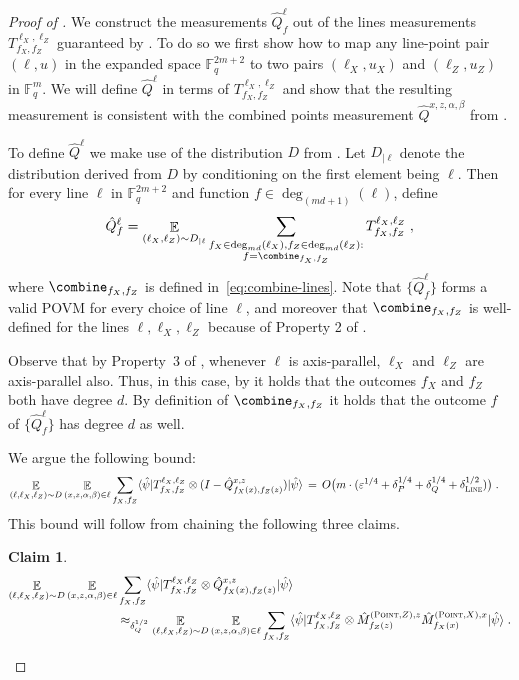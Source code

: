 \documentclass[11pt]{article}
\newtheorem{claim}[theorem]{Claim}
\theoremstyle{definition}
\newcommand{\ket}[1]{|#1\rangle}
\newcommand{\bra}[1]{\langle#1|}
\newcommand{\F}{\ensuremath{\mathbb{F}}}
\newcommand{\ot}{\otimes}
\newcommand{\eps}{\varepsilon}
\newcommand{\E}{\mathop{\mathbb{E}}\displaylimits}
\newcommand{\typestyle}[1]{\ensuremath{\textsc{#1}}\xspace}
\renewcommand{\line}{\mathbf{\ell}}
\newcommand{\Point}{\typestyle{Point}}
\newcommand{\Line}{\typestyle{Line}}
\begin{document}
\begin{proof}[Proof of ]
We construct the measurements $\hat{Q}^\line_f$
out of the lines measurements $T^{\line_X, \line_Z}_{f_X, f_Z}$
guaranteed by . To do so we first show how
to map any line-point pair $(\line, u)$ in the expanded space
$\F_q^{2m+2}$ to two pairs  $(\line_X, u_X)$ and  $(\line_Z, u_Z)$ in $\F_q^m$. We will 
define $\hat{Q}^\line$ in terms of $T^{\line_X, \line_Z}_{f_X, f_Z}$ and
show that the resulting measurement is consistent with the combined
points measurement $\hat{Q}^{x,z,\alpha, \beta}$ from .

To define $\hat{Q}^\line$ we make use of the distribution $D$ from . Let $D_{|\line}$ denote the distribution derived from $D$ by conditioning on the first element being $\line$. Then for every line $\line$ in $\F_q^{2m+2}$ and function $f \in \deg_{(md+1)}(\line)$, define
\[ \hat{Q}^\line_f = \E_{(\line_X, \line_Z) \sim D_{|\line}} \sum_{\substack{f_X \in \deg_{md}(\line_X), f_Z \in \deg_{md}(\line_Z):\\ f = \combine_{f_X, f_Z}}} T^{\line_X, \line_Z}_{f_X, f_Z}\;, \]
where $\combine_{f_X, f_Z}$ is defined in~\eqref{eq:combine-lines}. Note that $\{\hat{Q}^\line_f\}$ forms a valid POVM for every choice of line $\line$, and moreover that $\combine_{f_X, f_Z}$ is well-defined for the lines $\line, \line_X, \line_Z$ because of Property 2 of . 

Observe that by Property~3 of , whenever $\line$ is axis-parallel, $\line_X$ and $\line_Z$ are axis-parallel also. Thus, in this case, by  it holds that the outcomes $f_X$ and $f_Z$ both have degree $d$. By definition of $\combine_{f_X, f_Z}$ it holds that the outcome $f$ of $\{\hat{Q}^\line_f\}$ has degree $d$ as well.

We argue the following bound:
\begin{align}
  \E_{(\line, \line_X, \line_Z) \sim D} \E_{(x,z,\alpha, \beta) \in \line} &\sum_{f_X, f_Z} \bra{\hat{\psi}} T^{\line_X, \line_Z}_{f_X, f_Z} \ot (I - \hat{Q}^{x, z }_{f_X(x),f_Z(z)}) \ket{\hat{\psi}}  \,=\, O\big( m \cdot (\eps^{1/4} + \delta_P^{1/4} + \delta_Q^{1/4} + \delta_{\Line}^{1/2})\big)\;. \label{eq:qld-combined-lines-consistency}
\end{align}
This bound will follow from chaining the following three claims. 

\begin{claim}\label{claim:17-1}
\begin{align}
  \E_{(\line, \line_X, \line_Z) \sim D} \E_{(x,z,\alpha, \beta) \in \line} &\sum_{f_X, f_Z} \bra{\hat{\psi}} T^{\line_X, \line_Z}_{f_X, f_Z} \ot \hat{Q}^{x, z }_{f_X(x),f_Z(z)} \ket{\hat{\psi}}  \notag\\
       &\approx_{\delta_Q^{1/2}} \E_{(\line, \line_X, \line_Z) \sim D}  \E_{(x,z,\alpha, \beta) \in \line}  \sum_{f_X, f_Z} \bra{\hat{\psi}} T^{\line_X, \line_Z}_{f_X, f_Z} \ot \hat{M}^{(\Point,Z),z}_{f_Z(z)} \hat{M}^{(\Point,X),x}_{f_X(x)}  \ket{\hat{\psi}}\;. 
\end{align}
\end{claim}


\end{proof}
\end{document}
